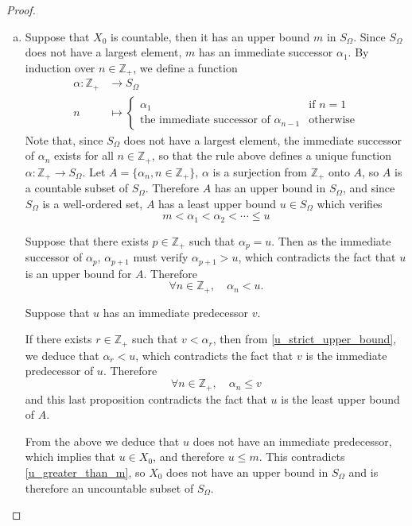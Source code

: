 \documentclass[11pt,a4paper,twoside]{article}
\theoremstyle{definition}
\begin{document}
\begin{proof}
\begin{enumerate}[(a)]
  \item Suppose that $X_0$ is countable, then it has an upper bound $m$ in $S_\Omega$. Since $S_\Omega$ does not have a largest element,
    $m$ has an immediate successor $\alpha_1$. By induction over $n \in \mathbb{Z}_+$, we define a function
    \begin{align*}
      \alpha : \mathbb{Z}_+ &\to S_\Omega \\
      n &\mapsto \begin{cases}
        \alpha_1 &\text{if } n = 1 \\
        \text{the immediate successor of } \alpha_{n - 1} &\text{otherwise}
      \end{cases}
    \end{align*}
    Note that, since $S_\Omega$ does not have a largest element, the immediate successor of $\alpha_n$ exists for all $n \in \mathbb{Z}_+$,
    so that the rule above defines a unique function $\alpha : \mathbb{Z}_+ \to S_\Omega$.
    Let $A = \{ \alpha_n, n \in \mathbb{Z}_+ \}$, $\alpha$ is a surjection from $\mathbb{Z}_+$ onto $A$, so $A$ is a countable subset of $S_\Omega$.
    Therefore $A$ has an upper bound in $S_\Omega$, and since $S_\Omega$ is a well-ordered set, $A$ has a least upper bound $u \in S_\Omega$
    which verifies
    \begin{equation} \label{u_greater_than_m}
      m < \alpha_1 < \alpha_2 < \dotsb \leq u
    \end{equation}

    Suppose that there exists $p \in \mathbb{Z}_+$ such that $\alpha_p = u$. Then as the immediate successor of $\alpha_p$, $\alpha_{p + 1}$ must verify
    $\alpha_{p + 1} > u$, which contradicts the fact that $u$ is an upper bound for $A$. Therefore
    \begin{equation} \label{u_strict_upper_bound}
      \forall n \in \mathbb{Z}_+, \quad \alpha_n < u.
    \end{equation}

    Suppose that $u$ has an immediate predecessor $v$.

    If there exists $r \in \mathbb{Z}_+$ such that $v < \alpha_r$, then from \eqref{u_strict_upper_bound}, we deduce that $\alpha_r < u$,
    which contradicts the fact that $v$ is the immediate predecessor of $u$. Therefore
    \begin{equation*}
      \forall n \in \mathbb{Z}_+, \quad \alpha_n \leq v
    \end{equation*}
    and this last proposition contradicts the fact that $u$ is the least upper bound of $A$.

    From the above we deduce that $u$ does not have an immediate predecessor, which implies that $u \in X_0$, and therefore $u \leq m$.
    This contradicts \eqref{u_greater_than_m}, so $X_0$ does not have an upper bound in $S_\Omega$ and is therefore an uncountable subset of $S_\Omega$.

  \end{enumerate}

\end{proof}
\end{document}
